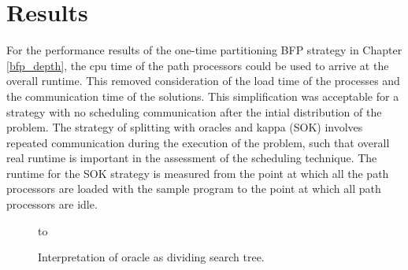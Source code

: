 \section{Results} %
\enlargethispage{\baselineskip}  %
For the performance results of the one-time partitioning BFP strategy
in Chapter \ref{bfp_depth}, the
cpu time of the path processors could be used to arrive at the overall runtime.
This removed consideration of the load time of the processes and the communication time
of the solutions.  This simplification was acceptable for a strategy with no
scheduling communication after the intial distribution of the problem.  The
strategy of splitting with oracles and kappa (SOK) involves repeated communication during
the execution of the problem, such that overall real runtime is important in the 
assessment of the scheduling technique.  The runtime for the 
SOK strategy is measured from the point at
which all the path processors are loaded with the sample program to the point at
which all path processors are idle.

\begin{figure}[htb]
\vspace{5mm} \hbox to 
\caption{Interpretation of oracle as dividing search tree.}
\vspace{5mm}
\label{zones}
\end{figure}

